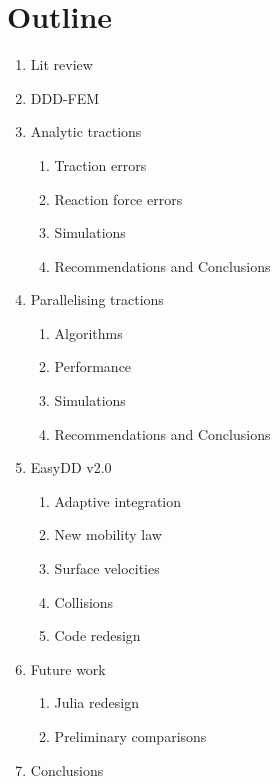 \chapter*{Outline}
\begin{enumerate}
    \item Lit review
    \item DDD-FEM
    \item Analytic tractions
          \begin{enumerate}
              \item Traction errors
              \item Reaction force errors
              \item Simulations
              \item Recommendations and Conclusions
          \end{enumerate}
    \item Parallelising tractions
          \begin{enumerate}
              \item Algorithms
              \item Performance
              \item Simulations
              \item Recommendations and Conclusions
          \end{enumerate}
    \item EasyDD v2.0
          \begin{enumerate}
              \item Adaptive integration
              \item New mobility law
              \item Surface velocities
              \item Collisions
              \item Code redesign
          \end{enumerate}
    \item Future work
          \begin{enumerate}
              \item Julia redesign
              \item Preliminary comparisons
          \end{enumerate}
    \item Conclusions
\end{enumerate}